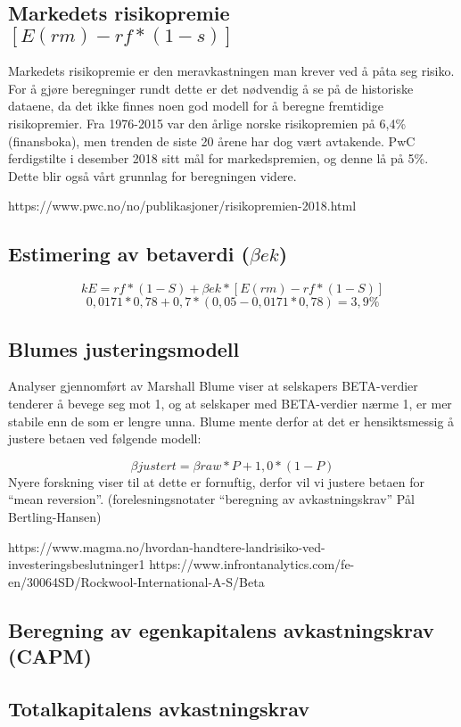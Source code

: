 \subsection{Markedets risikopremie \texorpdfstring{$[E(rm) - rf *(1 - s)]$}{}}
Markedets risikopremie er den meravkastningen man krever ved å påta seg risiko. For å gjøre beregninger rundt dette er det nødvendig å se på de historiske dataene, da det ikke finnes noen god modell for å beregne fremtidige risikopremier. Fra 1976-2015 var den årlige norske risikopremien på 6,4\% (finansboka), men trenden de siste 20 årene har dog vært avtakende. PwC ferdigstilte i desember 2018 sitt mål for markedspremien, og denne lå på 5\%. Dette blir også vårt grunnlag for beregningen videre. 

https://www.pwc.no/no/publikasjoner/risikopremien-2018.html

\subsection{Estimering av betaverdi \texorpdfstring{($\beta ek$)}{}}
\[kE = rf * (1-S) + \beta ek * [E(rm)-rf * (1-S)] \]
\[0,0171 * 0,78 + 0,7 * (0,05 - 0,0171 * 0,78)= 3,9\%\]

\subsection{Blumes justeringsmodell}
Analyser gjennomført av Marshall Blume viser at selskapers BETA-verdier tenderer å bevege seg mot 1, og at selskaper med BETA-verdier nærme 1, er mer stabile enn de som er lengre unna. Blume mente derfor at det er hensiktsmessig å justere betaen ved følgende modell:

\[\beta justert = \beta raw * P +1,0 *(1-P)\]
Nyere forskning viser til at dette er fornuftig, derfor vil vi justere betaen for “mean reversion”. (forelesningsnotater “beregning av avkastningskrav” Pål Bertling-Hansen)

https://www.magma.no/hvordan-handtere-landrisiko-ved-investeringsbeslutninger1
https://www.infrontanalytics.com/fe-en/30064SD/Rockwool-International-A-S/Beta

\subsection{Beregning av egenkapitalens avkastningskrav (CAPM)}
\subsection{Totalkapitalens avkastningskrav}
